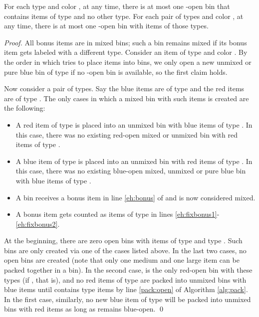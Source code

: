 \begin{aproperty}
	For each type  and color , at any time, there is at most one -open bin that contains items of type  and no other type.
	For each pair of types and color , at any time, there is at most one -open bin with items of those types.
\end{aproperty}
\begin{proof}
	All bonus items are in mixed bins; such a bin remains mixed if its bonus item gets labeled with a different type.
	Consider an item of type  and color .
By the order in which {\Pack} tries to place items into bins, we only open a new unmixed or pure blue bin of type  if no -open bin is available, so the first claim holds. 

Now consider a pair of types. Say the blue items are of type  and the red items are of type . 
The only cases in which a mixed bin with such items is created are the following:
\begin{itemize}
\item A red item of type  is placed into an unmixed bin  with blue items of type . In this case, there was no existing 
red-open mixed or unmixed bin with red items of type .
\item A blue item of type  is placed into an unmixed bin  with red items of type .
In this case, there was no existing blue-open mixed, unmixed or pure blue bin with blue items of type .
\item A bin receives a bonus item in line \ref{eh:bonus} of {\EHarm} and is now considered mixed.
\item A bonus item gets counted as items of type  in lines \ref{eh:fixbonus1}-\ref{eh:fixbonus2}.
\end{itemize}

At the beginning, there are zero open bins with items of type  and type .
Such bins are only created via one of the cases listed above. 
In the last two cases, no open bins are created (note that only one medium and one large item can be packed together in a bin).
In the second case,  is the only red-open bin with these types (if , that is), and no
red items of type  are packed into unmixed bins with blue items until  contains  type 
items by line \ref{pack:open} of Algorithm \ref{alg:pack}. In the first case, similarly, no new blue item of type  will be packed into unmixed bins with red items
as long as  remains blue-open.
\qed\end{proof}

